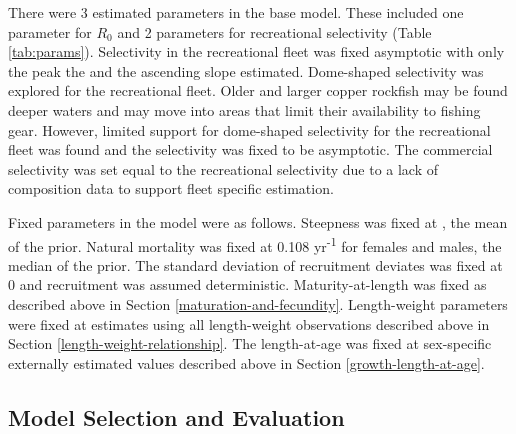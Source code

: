 \documentclass[11pt,
  english,
  a4paper,
]{article}
\begin{document}
\leavevmode\tagmcend\tagstructend


There were 3 estimated parameters in the base model. These included one parameter for {\(R_0\)\leavevmode\tagmcend\tagstructend} and 2 parameters for recreational selectivity (Table \ref{tab:params}). Selectivity in the recreational fleet was fixed asymptotic with only the peak the and the ascending slope estimated. Dome-shaped selectivity was explored for the recreational fleet. Older and larger copper rockfish may be found deeper waters and may move into areas that limit their availability to fishing gear. However, limited support for dome-shaped selectivity for the recreational fleet was found and the selectivity was fixed to be asymptotic. The commercial selectivity was set equal to the recreational selectivity due to a lack of composition data to support fleet specific estimation.

\leavevmode\tagmcend\tagstructend\par


Fixed parameters in the model were as follows. Steepness was fixed at , the mean of the prior. Natural mortality was fixed at 0.108 yr\textsuperscript{-1} for females and males, the median of the prior. The standard deviation of recruitment deviates was fixed at 0 and recruitment was assumed deterministic. Maturity-at-length was fixed as described above in Section \ref{maturation-and-fecundity}. Length-weight parameters were fixed at estimates using all length-weight observations described above in Section \ref{length-weight-relationship}. The length-at-age was fixed at sex-specific externally estimated values described above in Section \ref{growth-length-at-age}.

\leavevmode\tagmcend\tagstructend\par


\hypertarget{model-selection-and-evaluation}{%
\subsection{Model Selection and Evaluation}\label{model-selection-and-evaluation}}

\leavevmode\tagmcend\tagstructend

\end{document}
